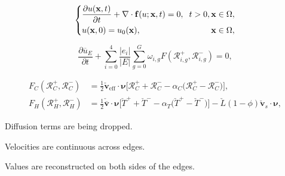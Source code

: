 \documentclass[usenames,dvipsnames,letterpaper,landscape,final]{slides}
\theoremstyle{definition}
\begin{document}
\begin{myslide}
\begin{equation*}\label{eq:conservationlaw}
		  \left \{
		  \begin{alignedat}{2}
					 &\frac{\partial u(\mathbf{x},t)}{\partial t} + \nabla \cdot \mathbf{f}(u; \mathbf{x},t) = 0, \hspace{0.2cm} t>0,\, &&\mathbf{x} \in \Omega, \\ 
					 &u(\mathbf{x},0) = u_0(\mathbf{x}), \hspace{2.5cm} &&\mathbf{x} \in \Omega,
		  \end{alignedat}
		  \right .
\end{equation*}

\begin{equation*}\label{eq:fvdis}
		  \frac{\partial \overline{u}_{E}}{\partial t} + \sum_{i=0}^4\frac{\lvert e_i \rvert}{\lvert E \rvert}
		  \sum_{g=0}^G \omega_{i,g} F(\mathcal{R}_{i,g}^+, \mathcal{R}_{i,g}^-) = 0,
\end{equation*}

\begin{equation*}
\label{eq:numflux}
\begin{aligned}
		  F_C(\mathcal{R}^+_C, \mathcal{R}^-_C) &= \frac{1}{2}\check{\mathbf{v}}_{\text{eff}}\cdot \pmb{\nu}
		  \Big[\mathcal{R}^+_C + \mathcal{R}^-_C - \alpha_C\big(\mathcal{R}^+_C - \mathcal{R}^-_C\big)\Big],\\
		  F_H(\mathcal{R}^+_H, \mathcal{R}^-_H) &= 
		  \frac{1}{2}\check{\overline{\mathbf{v}}}\cdot \pmb{\nu}
		  \Big[\check{T}^+ + \check{T}^- - \alpha_T \big(\check{T}^+ - \check{T}^-\big)  \Big] - \check{L} (1-\phi)\check{\mathbf{v}}_s\cdot\pmb{\nu},
\end{aligned}
\end{equation*}

		  \parbox{0.7\textwidth}{\raggedright
		  \begin{blist}
		  \item Diffusion terms are being dropped.
		  \item Velocities are continuous across edges.
		  \item Values are reconstructed on both sides of the edges.
		  \end{blist}
		  }\parbox{0.3\textwidth}{\raggedright
{}}
\end{myslide}
\end{document}
